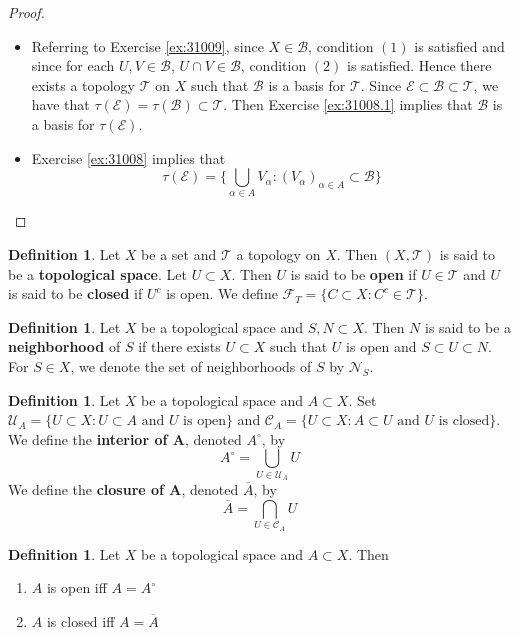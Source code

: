 \documentclass[12pt]{amsart}
\theoremstyle{definition}
\newtheorem{defn}[definition]{Definition}
\newcommand{\al}{\alpha}
\newcommand{\MC}{\mathcal{C}}
\newcommand{\MB}{\mathcal{B}}
\newcommand{\MF}{\mathcal{F}}
\newcommand{\MN}{\mathcal{N}}
\newcommand{\ME}{\mathcal{E}}
\newcommand{\MT}{\mathcal{T}}
\newcommand{\MU}{\mathcal{U}}
\newcommand{\ld}[1]{\label{defn:#1}}
\newcommand{\rex}[1]{Exercise \ref{ex:#1}}
\begin{document}
	\begin{proof}\
	\begin{itemize}
	\item Referring to \rex{31009}, since $X \in \MB$, condition $(1)$ is satisfied and since for each $U, V \in \MB$, $U \cap V \in \MB$, condition $(2)$ is satisfied. Hence there exists a topology $\MT$ on $X$ such that $\MB$ is a basis for $\MT$. Since $\ME \subset \MB \subset \MT$, we have that $\tau(\ME) = \tau(\MB) \subset \MT$. Then \rex{31008.1} implies that $\MB$ is a basis for $\tau(\ME)$.
	\item \rex{31008} implies that $$\tau(\ME) = \bigg \{ \bigcup_{\al \in A} V_{\al}: (V_{\al})_{\al \in A} \subset \MB \bigg \}$$
	\end{itemize}
	
	\end{proof}
	
	\begin{defn} \ld{31011}
	Let $X$ be a set and $\MT$ a topology on $X$. Then $(X, \MT)$ is said to be a \textbf{topological space}. Let $U \subset X$. Then $U$ is said to be \textbf{open} if $U \in \MT$ and $U$ is said to be \textbf{closed} if $U^c$ is open. We define $\MF_T = \{C \subset X: C^c \in \MT  \}$. 
	\end{defn}
	
	\begin{defn} \ld{31012}
	Let $X$ be a topological space and $S,N \subset X$. Then $N$ is said to be a \textbf{neighborhood} of $S$ if there exists $U \subset X$ such that $U$ is open and $S \subset U \subset N$. For $S \in X$, we denote the set of neighborhoods of $S$ by $\MN_S$.
	\end{defn}
	
	\begin{defn} \ld{31013}
	Let $X$ be a topological space and $A \subset X$. Set $\MU_{A} = \{U \subset X:U \subset A \text{ and $U$ is open}\}$ and $\MC_{A} = \{U \subset X: A \subset U \text{ and $U$ is closed}\}$. \\
	We define the \textbf{interior of A}, denoted $A^{\circ}$, by $$A^{\circ} = \bigcup_{U \in \MU_{A}} U$$ 
	We define the \textbf{closure of A}, denoted $\overline{A}$, by $$\overline{A} = \bigcap_{U \in \MC_{A}} U$$ 
	\end{defn}
	
	\begin{defn} \ld{31014}
	Let $X$ be a topological space and $A \subset X$. Then 
	\begin{enumerate}
	\item $A$ is open iff $A = A^{\circ}$ 
	\item $A$ is closed iff $A = \overline{A}$
	\end{enumerate}
	\end{defn}
	
\end{document}
